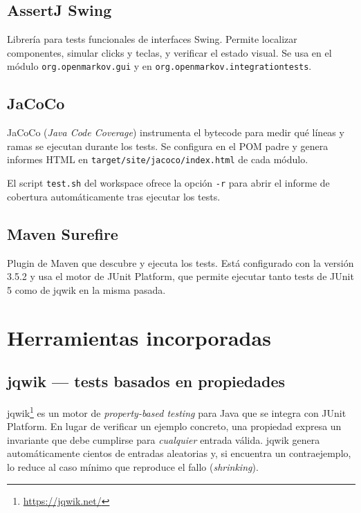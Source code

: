 \documentclass[12pt,a4paper]{article}
\begin{document}
\subsection{AssertJ Swing}
\label{sec:assertj-swing}

Librería para tests funcionales de interfaces Swing. Permite localizar
componentes, simular clicks y teclas, y verificar el estado visual. Se usa
en el módulo \texttt{org.openmarkov.gui} y en
\texttt{org.openmarkov.integrationtests}.

\subsection{JaCoCo}
\label{sec:jacoco}

JaCoCo (\emph{Java Code Coverage}) instrumenta el bytecode para medir qué
líneas y ramas se ejecutan durante los tests. Se configura en el POM padre y
genera informes HTML en \texttt{target/site/jacoco/index.html} de cada módulo.

El script \texttt{test.sh} del workspace ofrece la opción \texttt{-r} para
abrir el informe de cobertura automáticamente tras ejecutar los tests.

\subsection{Maven Surefire}
\label{sec:surefire}

Plugin de Maven que descubre y ejecuta los tests. Está configurado con la
versión 3.5.2 y usa el motor de JUnit Platform, que permite ejecutar
tanto tests de JUnit 5 como de jqwik en la misma pasada.


\section{Herramientas incorporadas}
\label{sec:nuevas}

\subsection{jqwik --- tests basados en propiedades}
\label{sec:jqwik}

jqwik\footnote{\url{https://jqwik.net/}} es un motor de \emph{property-based
testing} para Java que se integra con JUnit Platform. En lugar de verificar
un ejemplo concreto, una propiedad expresa un invariante que debe cumplirse
para \emph{cualquier} entrada válida. jqwik genera automáticamente cientos de
entradas aleatorias y, si encuentra un contraejemplo, lo reduce al caso
mínimo que reproduce el fallo (\emph{shrinking}).
\end{document}
